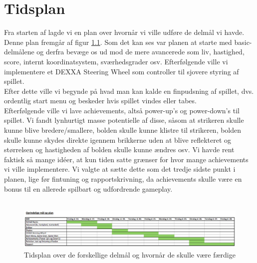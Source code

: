\chapter{Tidsplan}
Fra starten af lagde vi en plan over hvornår vi ville udføre de delmål vi havde. Denne plan fremgår af figur \ref{fig:tidsplan1}. Som det kan ses var planen at starte med basic-delmålene og derfra bevæge os ud mod de mere avancerede som liv, hastighed, score, internt koordinatsystem, sværhedsgrader osv. Efterfølgende ville vi implementere et DEXXA Steering Wheel som controller til sjovere styring af spillet.\\
Efter dette ville vi begynde på hvad man kan kalde en finpudsning af spillet, dvs. ordentlig start menu og beskeder hvis spillet vindes eller tabes. \\

Efterfølgende ville vi lave achievements, altså power-up's og power-down's til spillet. Vi fandt lynhurtigt masse potentielle af disse, såsom at strikeren skulle kunne blive bredere/smallere, bolden skulle kunne klistre til strikeren, bolden skulle kunne skydes direkte igennem brikkerne uden at blive reflekteret og størrelsen og hastigheden af bolden skulle kunne ændres osv. Vi havde rent faktisk så mange idéer, at kun tiden satte grænser for hvor mange achievements vi ville implementere. Vi valgte at sætte dette som det tredje sidste punkt i planen, lige før fintuning og rapportskrivning, da achievements skulle være en bonus til en allerede spilbart og udfordrende gameplay.\\ \\


\begin{figure}[h!]
\centering
\includegraphics[scale=0.4]{figs/Tidsplan1.png}
\caption{Tidsplan over de forskellige delmål og hvornår de skulle være færdige}
\label{fig:tidsplan1}
\end{figure}